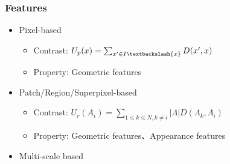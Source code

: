 \documentclass[notheorems,serif,table,compress]{beamer}  %
\begin{document}




\begin{frame}
\frametitle{Features}
\begin{itemize}
\item Pixel-based
\begin{itemize}
\item Contrast: $U_p(x) = \sum_{x'\in I\textbackslash \{ x\}}D(x', x)$
\item Property: Geometric features
\end{itemize}
\item Patch/Region/Superpixel-based
\begin{itemize}
\item {\color{magenta}Contrast}: $U_r(A_i) = \sum_{1\le k \le N, k \ne i}|\Lambda|D(\Lambda_k, \Lambda_i)$
\item {\color{magenta}Property}: Geometric features、Appearance features
\end{itemize}
\item Multi-scale based
\end{itemize}
\end{frame}
\end{document}
